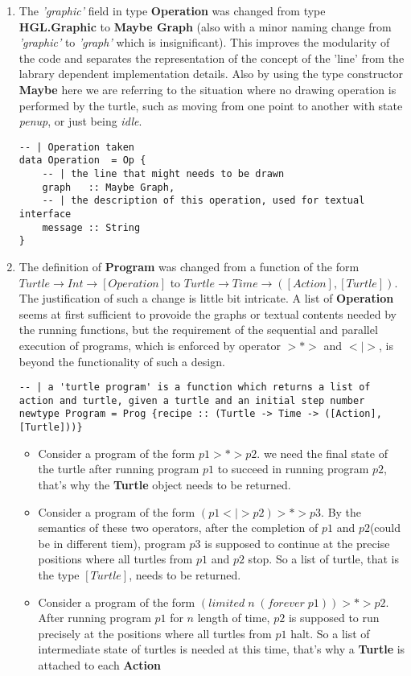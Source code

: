 \documentclass[10pt]{article}
\begin{document}
\begin{enumerate}
\item The \textit{'graphic'} field in type \textbf{Operation} was changed from type \textbf{HGL.Graphic} to \textbf{Maybe Graph} (also with a minor naming change from \textit{'graphic'} to \textit{'graph'} which is insignificant). This improves the modularity of the code and separates the representation of the concept of the 'line' from the labrary dependent implementation details. Also by using the type constructor \textbf{Maybe} here we are referring to the situation where no drawing operation is performed by the turtle, such as moving from one point to another with state \textit{penup}, or just being \textit{idle}.
\begin{lstlisting}
-- | Operation taken
data Operation  = Op {
    -- | the line that might needs to be drawn
    graph   :: Maybe Graph,
    -- | the description of this operation, used for textual interface
    message :: String
}
\end{lstlisting}

\item The definition of \textbf{Program} was changed from a function of the form $ Turtle \rightarrow Int \rightarrow [Operation] $ to $Turtle \rightarrow Time \rightarrow ([Action], [Turtle]) $. The justification of such a change is little bit intricate. A list of \textbf{Operation} seems at first sufficient to provoide the graphs or textual contents  needed by the running functions, but the requirement of the  sequential and parallel execution of programs, which is enforced by operator $>*>$ and $<|>$, is beyond the functionality of such a design.
\begin{lstlisting}
-- | a 'turtle program' is a function which returns a list of action and turtle, given a turtle and an initial step number
newtype Program = Prog {recipe :: (Turtle -> Time -> ([Action], [Turtle]))}
\end{lstlisting}

\begin{itemize}
\item Consider a program of the form $p1 >*> p2$. we need the final state of the turtle after running program $p1$ to succeed in running program $p2$, that's why the \textbf{Turtle} object needs to be returned.
\item Consider a program of the form $(p1 <|> p2) >*> p3$. By the semantics of these two operators, after the completion of $p1$ and $p2$(could be in different tiem), program $p3$ is supposed to continue at the precise positions where all turtles from $p1$ and $p2$ stop. So a list of turtle, that is the type $[Turtle]$, needs to be returned.
\item Consider a program of the form $(limited\; n\; (forever\; p1)) >*> p2$. After running program $p1$ for $n$ length of time, $p2$ is supposed to run precisely at the positions where all turtles from $p1$ halt. So a list of intermediate state of turtles is needed at this time, that's why a \textbf{Turtle} is attached to each  \textbf{Action}
\end{itemize}
\end{enumerate}
\end{document}
